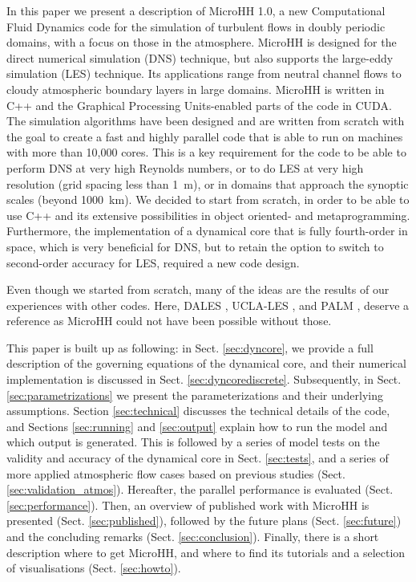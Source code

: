 \documentclass[gmd,manuscript]{copernicus}
\begin{document}
\introduction  %
In this paper we present a description of MicroHH 1.0, a new Computational Fluid Dynamics code for the simulation of turbulent flows in doubly periodic domains, with a focus on those in the atmosphere. MicroHH is designed for the direct numerical simulation (DNS) technique, but also supports the large-eddy simulation (LES) technique. Its applications range from neutral channel flows to cloudy atmospheric boundary layers in large domains. MicroHH is written in C++ and the Graphical Processing Units-enabled parts of the code in CUDA. The simulation algorithms have been designed and are written from scratch with the goal to create a fast and highly parallel code that is able to run on machines with more than 10,000 cores. This is a key requirement for the code to be able to perform DNS at very high Reynolds numbers, or to do LES at very high resolution (grid spacing less than 1~m), or in domains that approach the synoptic scales (beyond 1000~km). We decided to start from scratch, in order to be able to use C++ and its extensive possibilities in object oriented- and metaprogramming. Furthermore, the implementation of a dynamical core that is fully fourth-order in space, which is very beneficial for DNS, but to retain the option to switch to second-order accuracy for LES, required a new code design.

Even though we started from scratch, many of the ideas are the results of our experiences with other codes. Here, DALES \citep{Heus2010}, UCLA-LES \citep{Stevens2005}, and PALM \citep{Maronga2015}, deserve a reference as MicroHH could not have been possible without those.

This paper is built up as following: in Sect. \ref{sec:dyncore}, we provide a full description of the governing equations of the dynamical core, and their numerical implementation is discussed in Sect. \ref{sec:dyncorediscrete}. Subsequently, in Sect. \ref{sec:parametrizations} we present the parameterizations and their underlying assumptions. Section \ref{sec:technical} discusses the technical details of the code, and Sections \ref{sec:running} and \ref{sec:output} explain how to run the model and which output is generated. This is followed by a series of model tests on the validity and accuracy of the dynamical core in Sect. \ref{sec:tests}, and a series of more applied atmospheric flow cases based on previous studies (Sect. \ref{sec:validation_atmos}). Hereafter, the parallel performance is evaluated (Sect. \ref{sec:performance}). Then, an overview of published work with MicroHH is presented (Sect. \ref{sec:published}), followed by the future plans (Sect. \ref{sec:future}) and the concluding remarks (Sect. \ref{sec:conclusion}). Finally, there is a short description where to get MicroHH, and where to find its tutorials and a selection of visualisations (Sect. \ref{sec:howto}).
\end{document}
